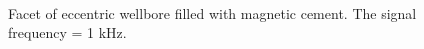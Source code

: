 \documentclass[10pt,twoside]{article}
\begin{document}
\begin{figure}[ht!]
\begin{minipage}{0.50\linewidth}
\end{minipage}
\hfill
\begin{minipage}{0.50\linewidth}
\end{minipage}
\caption{Facet of eccentric wellbore filled with magnetic cement. The signal frequency = 1 kHz. }
\label{facet_ecctr_cement}\
\end{figure}
\end{document}
